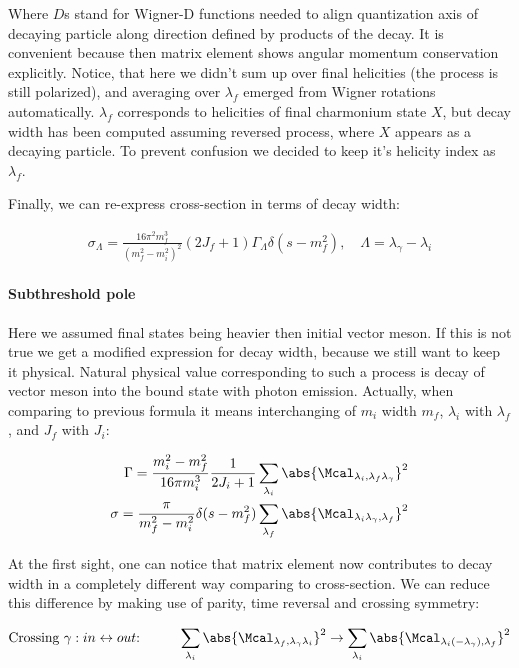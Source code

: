 Where $D$s stand for Wigner-D functions needed to align quantization axis of decaying particle along direction defined by products of the decay. It is convenient because then matrix element shows angular momentum conservation explicitly. Notice, that here we didn't sum up over final helicities (the process is still polarized), and averaging over $\lambda_f$ emerged from Wigner rotations automatically. $\lambda_f$ corresponds to helicities of final charmonium state $X$, but decay width has been computed assuming reversed process, where $X$ appears as a decaying particle. To prevent confusion we decided to keep it's helicity index as $\lambda_f$.

Finally, we can re-express cross-section in terms of decay width:

\begin{align} \label{eq:app:crsc-dw}
    \sigma_{\Lambda} = \frac{16 \pi^2 m_f^3}{(m_f^2 - m_i^2)^2} (2J_f + 1) \Gamma_{\Lambda} \delta(s - m_f^2),\quad \Lambda = \lambda_\gamma - \lambda_i
\end{align}

\paragraph{Subthreshold pole} Here we assumed final states being heavier then initial vector meson. If this is not true we get a modified expression for decay width, because we still want to keep it physical. Natural physical value corresponding to such a process is decay of vector meson into the bound state with photon emission. Actually, when comparing to previous formula it means interchanging of $m_i$ width $m_f$, $\lambda_i$ with $\lambda_f$, and $J_f$ with $J_i$:

\begin{align}
        \Gamma = \frac{m_i^2 - m_f^2}{16 \pi m_i^3} \frac{1}{2J_i + 1} \sum_{\lambda_i} \abs{\Mcal_{\lambda_i, \lambda_f \lambda_\gamma}}^2 \\
        \sigma = \frac{\pi}{m_f^2 - m_i^2} \delta(s - m_f^2) \sum_{\lambda_f} \abs{\Mcal_{\lambda_i \lambda_\gamma, \lambda_f}}^2
\end{align}

At the first sight, one can notice that matrix element now contributes to decay width in a completely different way comparing to cross-section. We can reduce this difference by making use of parity, time reversal and crossing symmetry:

\begin{align}
    &\text{Crossing $\gamma: in \leftrightarrow out$:}\qquad &\sum_{\lambda_i} \abs{\Mcal_{\lambda_f, \lambda_\gamma \lambda_i}}^2 \rightarrow \sum_{\lambda_i} \abs{\Mcal_{\lambda_i (-\lambda_\gamma), \lambda_f}}^2 \\
\end{align}

